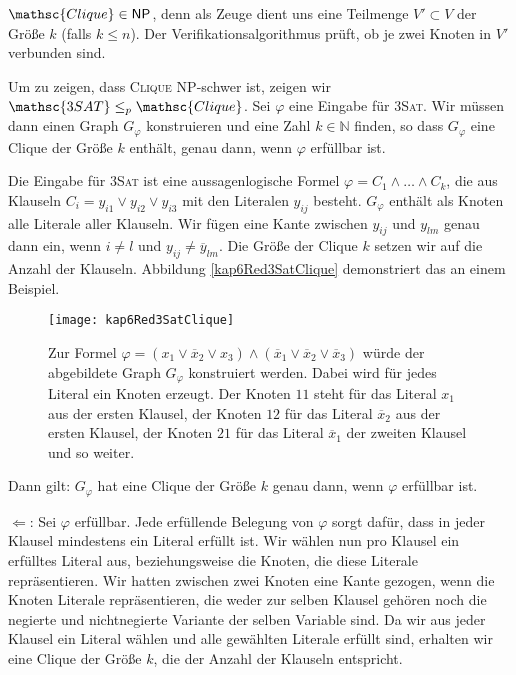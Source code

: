 \begin{Bew}
  \hspace{\parindent}$\mathsc{Clique} \in \mathsf{NP}$, denn als Zeuge dient uns eine Teilmenge $V' \subset V$ der Größe $k$ (falls $k \le n$). Der Verifikationsalgorithmus prüft, ob je zwei Knoten in $V'$ verbunden sind.
  
  Um zu zeigen, dass \textsc{Clique} \textsf{NP}-schwer ist, zeigen wir $\mathsc{3SAT} \le_p \mathsc{Clique}$. Sei $\varphi$ eine Eingabe für \textsc{3Sat}. Wir müssen dann einen Graph $G_{\varphi}$ konstruieren und eine Zahl $k \in \mathbb{N}$ finden, so dass $G_{\varphi}$ eine Clique der Größe $k$ enthält, genau dann, wenn $\varphi$ erfüllbar ist.
  
  Die Eingabe für \textsc{3Sat} ist eine aussagenlogische Formel $\varphi = C_1 \wedge \ldots \wedge C_k$, die aus Klauseln $C_i = y_{i1} \vee y_{i2} \vee y_{i3}$ mit den Literalen $y_{ij}$ besteht. $G_{\varphi}$ enthält als Knoten alle Literale aller Klauseln. Wir fügen eine Kante zwischen $y_{ij}$ und $y_{lm}$ genau dann ein, wenn $i \neq l$ und $y_{ij} \neq \overline{y}_{lm}$. Die Größe der Clique $k$ setzen wir auf die Anzahl der Klauseln. Abbildung \vref{kap6Red3SatClique} demonstriert das an einem Beispiel.
  
  \begin{figure}[htb]
    \centering
    \texttt{[image: kap6Red3SatClique]}
    \caption{Zur Formel $\varphi =(x_1 \vee \overline{x}_2 \vee x_3) \wedge (\overline{x}_1 \vee \overline{x}_2 \vee \overline{x}_{3})$ würde der abgebildete Graph $G_{\varphi}$ konstruiert werden. Dabei wird für jedes Literal ein Knoten erzeugt. Der Knoten $11$ steht für das Literal $x_1$ aus der ersten Klausel, der Knoten $12$ für das Literal $\overline{x}_2$ aus der ersten Klausel, der Knoten $21$ für das Literal $\overline{x}_1$ der zweiten Klausel und so weiter.}
    \label{kap6Red3SatClique}
  \end{figure}
  
  Dann gilt: $G_{\varphi}$ hat eine Clique der Größe $k$ genau dann, wenn $\varphi$ erfüllbar ist.
  
  \glq$\Leftarrow$\grq: Sei $\varphi$ erfüllbar. Jede erfüllende Belegung von $\varphi$ sorgt dafür, dass in jeder Klausel mindestens ein Literal erfüllt ist. Wir wählen nun pro Klausel ein erfülltes Literal aus, beziehungsweise die Knoten, die diese Literale repräsentieren. Wir hatten zwischen zwei Knoten eine Kante gezogen, wenn die Knoten Literale repräsentieren, die weder zur selben Klausel gehören noch die negierte und nichtnegierte Variante der selben Variable sind. Da wir aus jeder Klausel ein Literal wählen und alle gewählten Literale erfüllt sind, erhalten wir eine Clique der Größe $k$, die der Anzahl der Klauseln entspricht.
  

\end{Bew}

